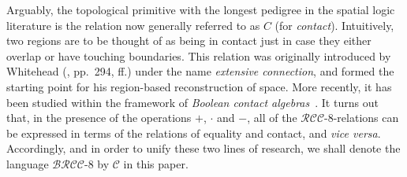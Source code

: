 \documentclass{LMCS}
\theoremstyle{plain}
\newcommand{\cBC}{\ensuremath{\mathcal{C}}}
\newcommand{\BRCCE}{\ensuremath{\mathcal{BRCC}\text{-}8}}
\newcommand{\RCCE}{\ensuremath{\mathcal{RCC}\text{-}8}}\newcommand{\RCCEcc}{\ensuremath{\RCCE{}cc}}\newcommand{\RCCEc}{\ensuremath{\RCCE{}c}}
\begin{document}
Arguably, the topological primitive with the longest pedigree in the
spatial logic literature is the relation now generally referred to as
$C$ (for \emph{contact}).  Intuitively, two regions are to be thought
of as being in contact just in case they either overlap or have
touching boundaries. This relation was originally introduced by
Whitehead (\cite{Whitehead29}, pp.~294, ff.) under the name {\em
  extensive connection}, and formed the starting point for his
region-based reconstruction of space. More recently, it has been
studied within the framework of \emph{Boolean contact algebras}~\cite{DV1,DW05}.
It turns out that, in the presence of the
operations $+$, $\cdot$ and $-$, all of the $\RCCE$-relations can be
expressed in terms of the relations of equality and contact, and \emph{vice versa}.
Accordingly, and in order to unify these two lines of
research, we shall denote the language $\BRCCE$ by $\cBC$ in this
paper.
\end{document}
